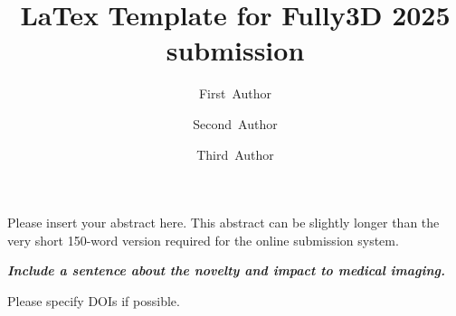 \documentclass[11pt,twocolumn,twoside]{article}
\begin{document}
\title{LaTex Template for Fully3D 2025 submission} 

\author[1]{First~Author}
\author[1,2]{Second~Author}
\author[2]{Third~Author}



\maketitle
\thispagestyle{fancy}





\begin{customabstract}
Please insert your abstract here. This abstract can be slightly longer than the very short 150-word version required for the online submission system. 

\bigskip

\textbf{\textit{\color{red}Include a sentence about the novelty and impact to medical imaging.}}

\end{customabstract}






\printbibliography
\color{red}Please specify DOIs if possible.
\end{document}
